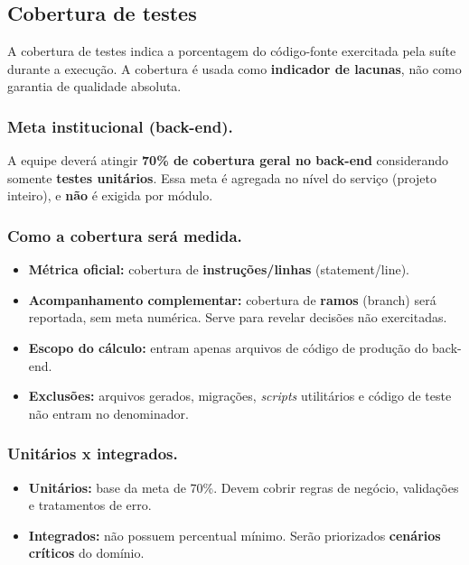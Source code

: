 \subsection{Cobertura de testes}

A cobertura de testes indica a porcentagem do código-fonte exercitada pela suíte durante a execução. A cobertura é usada como \textbf{indicador de lacunas}, não como garantia de qualidade absoluta.

\subsubsection{Meta institucional (back-end).}
A equipe deverá atingir \textbf{70\% de cobertura geral no back-end} considerando somente \textbf{testes unitários}. Essa meta é agregada no nível do serviço (projeto inteiro), e \textbf{não} é exigida por módulo.

\subsubsection{Como a cobertura será medida.}
\begin{itemize}
	\item \textbf{Métrica oficial:} cobertura de \textbf{instruções/linhas} (statement/line).
	\item \textbf{Acompanhamento complementar:} cobertura de \textbf{ramos} (branch) será reportada, sem meta numérica. Serve para revelar decisões não exercitadas.
	\item \textbf{Escopo do cálculo:} entram apenas arquivos de código de produção do back-end.
	\item \textbf{Exclusões:} arquivos gerados, migrações, \textit{scripts} utilitários e código de teste não entram no denominador.
\end{itemize}

\subsubsection{Unitários x integrados.}
\begin{itemize}
	\item \textbf{Unitários:} base da meta de 70\%. Devem cobrir regras de negócio, validações e tratamentos de erro.
	\item \textbf{Integrados:} não possuem percentual mínimo. Serão priorizados \textbf{cenários críticos} do domínio.
\end{itemize}


